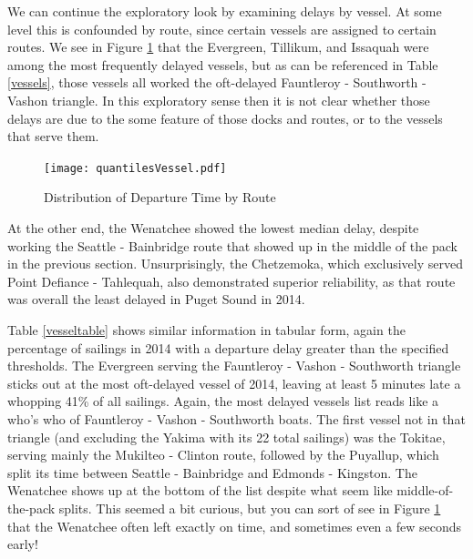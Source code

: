 \documentclass[11pt, letterpaper]{article}
\begin{document}
We can continue the exploratory look by examining delays by vessel. At some level this is confounded by route, since certain vessels are assigned to certain routes. We see in Figure \ref{vessel1} that the Evergreen, Tillikum, and Issaquah were among the most frequently delayed vessels, but as can be referenced in Table \ref{vessels}, those vessels all worked the oft-delayed Fauntleroy - Southworth - Vashon triangle. In this exploratory sense then it is not clear whether those delays are due to the some feature of those docks and routes, or to the vessels that serve them. 

\begin{figure}[htbp]
\begin{center}
\texttt{[image: quantilesVessel.pdf]}
\caption{Distribution of Departure Time by Route}
\label{vessel1}
\end{center}
\end{figure}

At the other end, the Wenatchee showed the lowest median delay, despite working the Seattle - Bainbridge route that showed up in the middle of the pack in the previous section. Unsurprisingly, the Chetzemoka, which exclusively served Point Defiance - Tahlequah, also demonstrated superior reliability, as that route was overall the least delayed in Puget Sound in 2014.

Table \ref{vesseltable} shows similar information in tabular form, again the percentage of sailings in 2014 with a departure delay greater than the specified thresholds.  The Evergreen serving the Fauntleroy - Vashon - Southworth triangle sticks out at the most oft-delayed vessel of 2014, leaving at least 5 minutes late a whopping 41\% of all sailings. Again, the most delayed vessels list reads like a who's who of Fauntleroy - Vashon - Southworth boats. The first vessel not in that triangle (and excluding the Yakima with its 22 total sailings) was the Tokitae, serving mainly the Mukilteo - Clinton route, followed by the Puyallup, which split its time between Seattle - Bainbridge and Edmonds - Kingston. The Wenatchee shows up at the bottom of the list despite what seem like middle-of-the-pack splits. This seemed a bit curious, but you can sort of see in Figure \ref{vessel1} that the Wenatchee often left exactly on time, and sometimes even a few seconds early!
\end{document}
